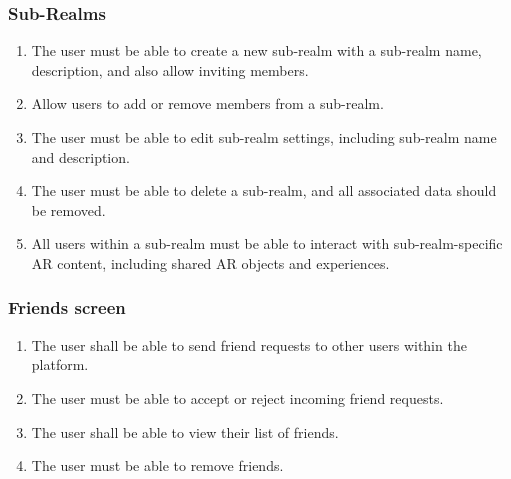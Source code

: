 \documentclass{article}
\begin{document}
\subsubsection{Sub-Realms}
\label{ssub:sub-realms}
\begin{enumerate}[align=left, label=\textbf{G-FR\arabic*:}]
    \item The user must be able to create a new sub-realm with a sub-realm name, description, and also allow inviting members.
    \item Allow users to add or remove members from a sub-realm.
    \item The user must be able to edit sub-realm settings, including sub-realm name and description.
    \item The user must be able to delete a sub-realm, and all associated data should be removed.
    \item All users within a sub-realm must be able to interact with sub-realm-specific AR content, including shared AR objects and experiences.
\end{enumerate}

\subsubsection{Friends screen}
\label{ssub:friends_screen}
\begin{enumerate}[align=left, label=\textbf{FS-FR\arabic*:}]
    \item The user shall be able to send friend requests to other users within the platform.
    \item The user must be able to accept or reject incoming friend requests.
    \item The user shall be able to view their list of friends.
    \item The user must be able to remove friends.
\end{enumerate}
\end{document}
